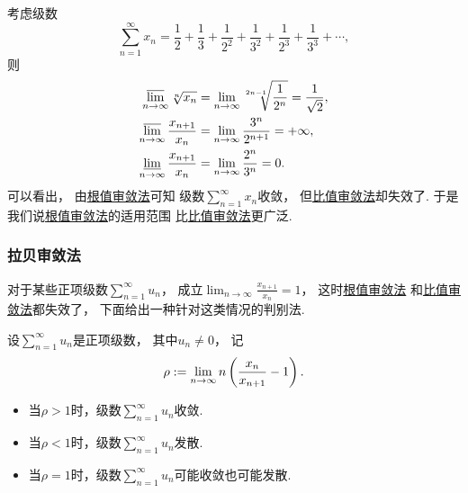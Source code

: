 \begin{example}
考虑级数\[
	\sum_{n=1}^\infty x_n
	= \frac12 + \frac13
	+ \frac1{2^2} + \frac1{3^2}
	+ \frac1{2^3} + \frac1{3^3}
	+ \dotsb,
\]
则\begin{align*}
	\varlimsup_{n\to\infty} \sqrt[n]{x_n}
	&= \lim_{n\to\infty} \sqrt[2n-1]{\frac1{2^n}}
	= \frac1{\sqrt2}, \\
	\varlimsup_{n\to\infty} \frac{x_{n+1}}{x_n}
	&= \lim_{n\to\infty} \frac{3^n}{2^{n+1}}
	= +\infty, \\
	\varliminf_{n\to\infty} \frac{x_{n+1}}{x_n}
	&= \lim_{n\to\infty} \frac{2^n}{3^n}
	= 0.
\end{align*}
可以看出，
由\hyperref[theorem:无穷级数.正项级数的根值审敛法]{根值审敛法}可知
级数\(\sum_{n=1}^\infty x_n\)收敛，
但\hyperref[theorem:无穷级数.正项级数的比值审敛法]{比值审敛法}却失效了.
于是我们说\hyperref[theorem:无穷级数.正项级数的根值审敛法]{根值审敛法}的适用范围
比\hyperref[theorem:无穷级数.正项级数的比值审敛法]{比值审敛法}更广泛.
\end{example}

\subsubsection{拉贝审敛法}
对于某些正项级数\(\sum_{n=1}^\infty u_n\)，
成立\(\lim_{n\to\infty} \frac{x_{n+1}}{x_n} = 1\)，
这时\hyperref[theorem:无穷级数.正项级数的根值审敛法]{根值审敛法}%
和\hyperref[theorem:无穷级数.正项级数的比值审敛法]{比值审敛法}都失效了，
下面给出一种针对这类情况的判别法.
\begin{theorem}[拉贝审敛法]
设\(\sum_{n=1}^\infty u_n\)是正项级数，
其中\(u_n\neq0\)，
记\[
	\rho := \lim_{n\to\infty} n \left(\frac{x_n}{x_{n+1}} - 1\right).
\]
\begin{itemize}
	\item 当\(\rho>1\)时，级数\(\sum_{n=1}^\infty u_n\)收敛.
	\item 当\(\rho<1\)时，级数\(\sum_{n=1}^\infty u_n\)发散.
	\item 当\(\rho=1\)时，级数\(\sum_{n=1}^\infty u_n\)可能收敛也可能发散.
\end{itemize}
\end{theorem}


